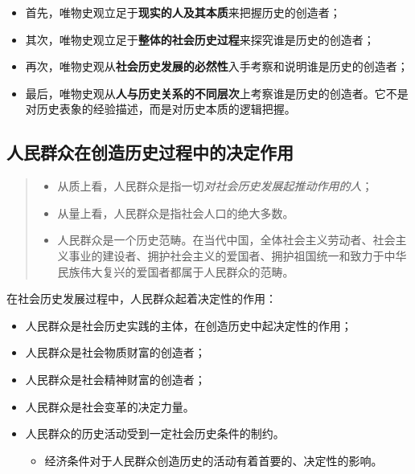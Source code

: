 \documentclass[
]{article}
\begin{document}
\begin{itemize}
\item
  首先，唯物史观立足于\textbf{现实的人及其本质}来把握历史的创造者；
\item
  其次，唯物史观立足于\textbf{整体的社会历史过程}来探究谁是历史的创造者；
\item
  再次，唯物史观从\textbf{社会历史发展的必然性}入手考察和说明谁是历史的创造者；
\item
  最后，唯物史观从\textbf{人与历史关系的不同层次}上考察谁是历史的创造者。它不是对历史表象的经验描述，而是对历史本质的逻辑把握。
\end{itemize}

\hypertarget{ux4ebaux6c11ux7fa4ux4f17ux5728ux521bux9020ux5386ux53f2ux8fc7ux7a0bux4e2dux7684ux51b3ux5b9aux4f5cux7528}{%
\subsection{人民群众在创造历史过程中的决定作用}\label{ux4ebaux6c11ux7fa4ux4f17ux5728ux521bux9020ux5386ux53f2ux8fc7ux7a0bux4e2dux7684ux51b3ux5b9aux4f5cux7528}}

\begin{quote}
\begin{itemize}
\item
  从质上看，人民群众是指一切\emph{对社会历史发展起推动作用的人}；
\item
  从量上看，人民群众是指社会人口的绝大多数。
\item
  人民群众是一个历史范畴。在当代中国，全体社会主义劳动者、社会主义事业的建设者、拥护社会主义的爱国者、拥护祖国统一和致力于中华民族伟大复兴的爱国者都属于人民群众的范畴。
\end{itemize}
\end{quote}

在社会历史发展过程中，人民群众起着决定性的作用：

\begin{itemize}
\item
  人民群众是社会历史实践的主体，在创造历史中起决定性的作用；
\item
  人民群众是社会物质财富的创造者；
\item
  人民群众是社会精神财富的创造者；
\item
  人民群众是社会变革的决定力量。
\item
  人民群众的历史活动受到一定社会历史条件的制约。

  \begin{itemize}
  \item
    经济条件对于人民群众创造历史的活动有着首要的、决定性的影响。
  \end{itemize}
\end{itemize}
\end{document}
